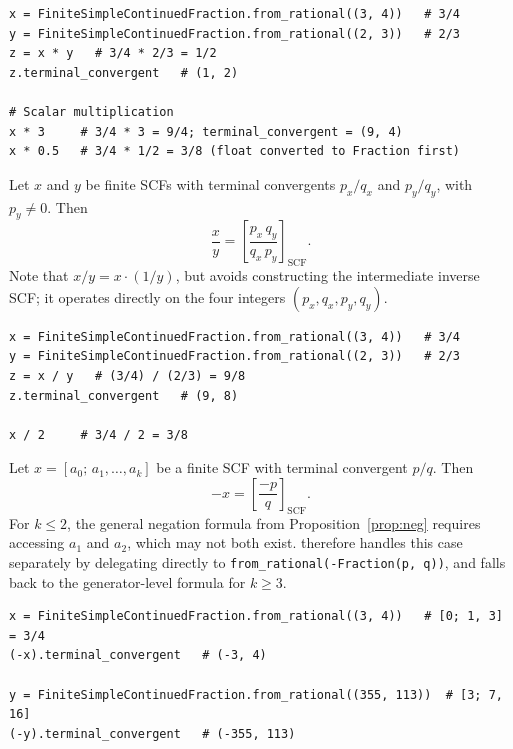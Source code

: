 \begin{catenadef}
\begin{lstlisting}[style=python]
x = FiniteSimpleContinuedFraction.from_rational((3, 4))   # 3/4
y = FiniteSimpleContinuedFraction.from_rational((2, 3))   # 2/3
z = x * y   # 3/4 * 2/3 = 1/2
z.terminal_convergent   # (1, 2)

# Scalar multiplication
x * 3     # 3/4 * 3 = 9/4; terminal_convergent = (9, 4)
x * 0.5   # 3/4 * 1/2 = 3/8 (float converted to Fraction first)
\end{lstlisting}
\end{catenadef}

\begin{proposition}\label{prop:fscf-div}
  Let $x$ and $y$ be finite SCFs with terminal convergents $p_x/q_x$ and
  $p_y/q_y$, with $p_y \neq 0$.  Then
  \[
    \frac{x}{y}
      = \left[\frac{p_x\, q_y}{q_x\, p_y}\right]_{\!\mathrm{SCF}}.
  \]
  Note that $x / y = x \cdot (1/y)$, but \catena avoids constructing the
  intermediate inverse SCF; it operates directly on the four integers
  $(p_x, q_x, p_y, q_y)$.
\end{proposition}

\begin{catenadef}
\begin{lstlisting}[style=python]
x = FiniteSimpleContinuedFraction.from_rational((3, 4))   # 3/4
y = FiniteSimpleContinuedFraction.from_rational((2, 3))   # 2/3
z = x / y   # (3/4) / (2/3) = 9/8
z.terminal_convergent   # (9, 8)

x / 2     # 3/4 / 2 = 3/8
\end{lstlisting}
\end{catenadef}

\begin{proposition}\label{prop:fscf-neg}
  Let $x = [a_0;\, a_1, \ldots, a_k]$ be a finite SCF with terminal
  convergent $p/q$.  Then
  \[
    -x = \left[\frac{-p}{q}\right]_{\!\mathrm{SCF}}.
  \]
  For $k \leq 2$, the general negation formula from
  Proposition~\ref{prop:neg} requires accessing $a_1$ and $a_2$, which may
  not both exist.  \catena therefore handles this case separately by
  delegating directly to \texttt{from\_rational(-Fraction(p, q))}, and
  falls back to the generator-level formula for $k \geq 3$.
\end{proposition}

\begin{catenadef}
\begin{lstlisting}[style=python]
x = FiniteSimpleContinuedFraction.from_rational((3, 4))   # [0; 1, 3] = 3/4
(-x).terminal_convergent   # (-3, 4)

y = FiniteSimpleContinuedFraction.from_rational((355, 113))  # [3; 7, 16]
(-y).terminal_convergent   # (-355, 113)
\end{lstlisting}
\end{catenadef}

